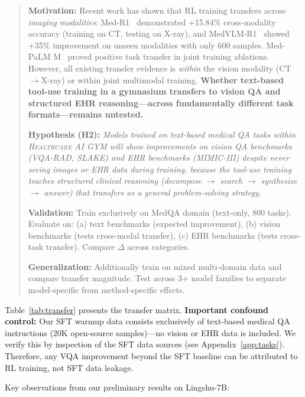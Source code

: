 \documentclass{article}
\newcommand{\gym}{\textsc{Healthcare AI GYM}}
\begin{document}
\begin{quote}
\textbf{Motivation:} Recent work has shown that RL training transfers across \emph{imaging modalities}: Med-R1~\citep{lai2025medr1} demonstrated +15.84\% cross-modality accuracy (training on CT, testing on X-ray), and MedVLM-R1~\citep{pan2025medvlmr1} showed +35\% improvement on unseen modalities with only 600 samples. Med-PaLM M~\citep{tu2024medpalmm} proved positive task transfer in joint training ablations. However, all existing transfer evidence is \emph{within} the vision modality (CT$\to$X-ray) or within joint multimodal training. \textbf{Whether text-based tool-use training in a gymnasium transfers to vision QA and structured EHR reasoning---across fundamentally different task formats---remains untested.}

\textbf{Hypothesis (H2):} \textit{Models trained on text-based medical QA tasks within \gym{} will show improvements on vision QA benchmarks (VQA-RAD, SLAKE) and EHR benchmarks (MIMIC-III) despite never seeing images or EHR data during training, because the tool-use training teaches structured clinical reasoning (decompose $\to$ search $\to$ synthesize $\to$ answer) that transfers as a general problem-solving strategy.}

\textbf{Validation:} Train exclusively on MedQA domain (text-only, 800 tasks). Evaluate on: (a) text benchmarks (expected improvement), (b) vision benchmarks (tests cross-modal transfer), (c) EHR benchmarks (tests cross-task transfer). Compare $\Delta$ across categories.

\textbf{Generalization:} Additionally train on mixed multi-domain data and compare transfer magnitude. Test across 3+ model families to separate model-specific from method-specific effects.
\end{quote}

Table~\ref{tab:transfer} presents the transfer matrix. \textbf{Important confound control:} Our SFT warmup data consists exclusively of text-based medical QA instructions (20K open-source samples)---no vision or EHR data is included. We verify this by inspection of the SFT data sources (see Appendix~\ref{app:tasks}). Therefore, any VQA improvement beyond the SFT baseline can be attributed to RL training, not SFT data leakage.

Key observations from our preliminary results on Lingshu-7B:
\end{document}
